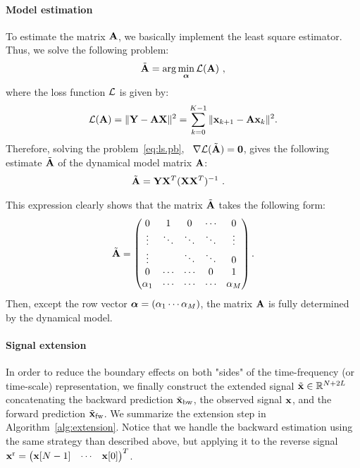 \paragraph{Model estimation} To estimate the matrix ${\mathbf A}$, we basically implement the least square estimator. Thus, we solve the following problem:
\begin{equation}
\label{eq:ls.pb}
\tilde\bA = \arg\min_{\balpha} \cL(\bA)\ ,
\end{equation}
where the loss function ${\mathcal L}$ is given by:
\[
{\mathcal L}({\mathbf A}) = \|{\mathbf Y}-{\mathbf A}{\mathbf X}\|^2 = \sum_{k=0}^{K-1} \|{\mathbf x}_{k+1}-{\mathbf A}{\mathbf x}_k\|^2.
\]
Therefore, solving the problem~\eqref{eq:ls.pb}, \ie~$\nabla {\mathcal L}(\tilde{{\mathbf A}})=\boldsymbol{0}$, gives the following estimate $\tilde{{\mathbf A}}$ of the dynamical model matrix ${\mathbf A}$:
\begin{align}
\tilde\bA &= \bY\bX^T(\bX\bX^T)^{-1}\ .
\label{eq:lse}
\end{align}

\begin{remark}
This expression clearly shows that the matrix $\tilde{{\mathbf A}}$ takes the following form:
\[
\tilde{{\mathbf A}} =
\begin{pmatrix}
0       & 1       & 0      & \cdots & 0      \\
\vdots  & \ddots  & \ddots & \ddots & \vdots  \\
\vdots  &         & \ddots & \ddots & 0  \\
0       & \cdots  & \cdots & 0      & 1  \\
\alpha_1& \cdots  & \cdots & \cdots & \alpha_M  \\
\end{pmatrix}.
\]
Then, except the row vector $\boldsymbol{\alpha} = \left(\alpha_1 \cdots\alpha_M\right)$, the matrix ${\mathbf A}$ is fully determined by the dynamical model.
\end{remark}

\paragraph{Signal extension} In order to reduce the boundary effects on both "sides" of the time-frequency (or time-scale) representation, we finally construct the extended signal $\tilde{{\mathbf x}}\in{\mathbb R}^{N+2L}$ concatenating the backward prediction $\tilde{{\mathbf x}}_{\rm bw}$, the observed signal ${\mathbf x}$, and the forward prediction $\tilde{{\mathbf x}}_{\rm fw}$. We summarize the extension step in Algorithm~\ref{alg:extension}. Notice that we handle the backward estimation using the same strategy than described above, but applying it to the reverse signal ${\mathbf x}^{\rm r} = \begin{pmatrix} {\mathbf x}[N-1] & \cdots & {\mathbf x}[0] \end{pmatrix}^T$.

